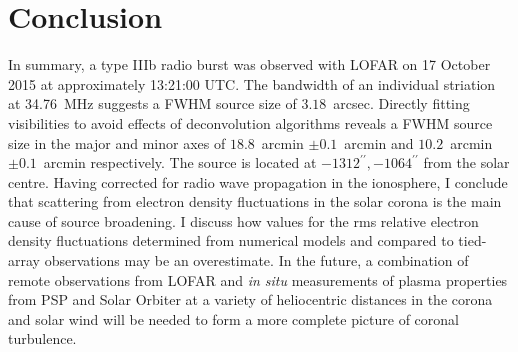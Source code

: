 \section{Conclusion}
In summary, a type IIIb radio burst was observed with LOFAR on 17 October 2015 at approximately 13:21:00 UTC. The bandwidth of an individual striation at 34.76~MHz suggests a FWHM source size of $3.18$~arcsec. Directly fitting visibilities to avoid effects of deconvolution algorithms reveals a FWHM source size in the major and minor axes of $18.8$~arcmin $\pm 0.1$~arcmin and $10.2$~arcmin $\pm 0.1$~arcmin respectively. The source is located at $-1312^{\prime\prime}, -1064^{\prime\prime}$ from the solar centre. 
Having corrected for radio wave propagation in the ionosphere, I conclude that scattering from electron density fluctuations in the solar corona is the main cause of source broadening. I discuss how values for the rms relative electron density fluctuations determined from numerical models and compared to tied-array observations may be an overestimate. 
In the future, a combination of remote observations from LOFAR and \textit{in situ} measurements of plasma properties from PSP and Solar Orbiter \citep{Muller2013,Muller2020} at a variety of heliocentric distances in the corona and solar wind will be needed to form a more complete picture of coronal turbulence.